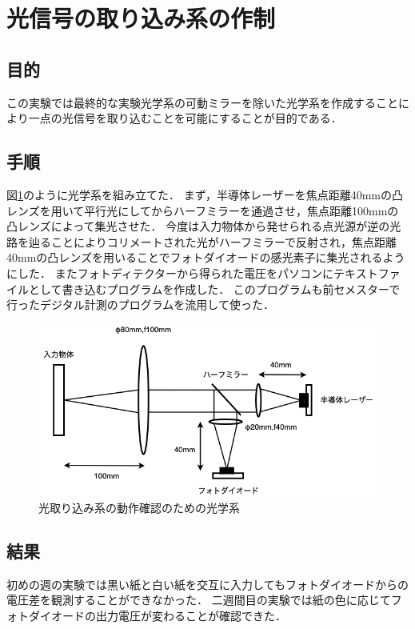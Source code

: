\documentclass[11pt, a4paper,twocolumn]{jarticle}
\begin{document}
\section{光信号の取り込み系の作制}
\subsection{目的}
この実験では最終的な実験光学系の可動ミラーを除いた光学系を作成することにより一点の光信号を取り込むことを可能にすることが目的である．

\subsection{手順}
図\ref{fig:a}のように光学系を組み立てた．
まず，半導体レーザーを焦点距離40mmの凸レンズを用いて平行光にしてからハーフミラーを通過させ，焦点距離100mmの凸レンズによって集光させた．
今度は入力物体から発せられる点光源が逆の光路を辿ることによりコリメートされた光がハーフミラーで反射され，焦点距離40mmの凸レンズを用いることでフォトダイオードの感光素子に集光されるようにした．
またフォトディテクターから得られた電圧をパソコンにテキストファイルとして書き込むプログラムを作成した．
このプログラムも前セメスターで行ったデジタル計測のプログラムを流用して使った．

\begin{figure}[ht]
 \begin{center}
  \includegraphics[width=0.8\linewidth]{fig4.png}
 \end{center}
 \caption{光取り込み系の動作確認のための光学系}
 \label{fig:a}
\end{figure}

\subsection{結果}
初めの週の実験では黒い紙と白い紙を交互に入力してもフォトダイオードからの電圧差を観測することができなかった．
二週間目の実験では紙の色に応じてフォトダイオードの出力電圧が変わることが確認できた．
\end{document}
